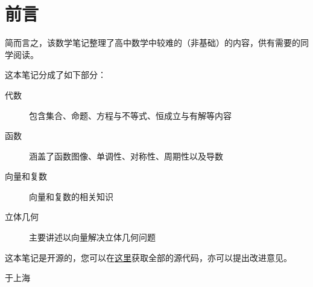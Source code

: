 \section*{前言}
简而言之，该数学笔记整理了高中数学中较难的（非基础）的内容，供有需要的同学阅读。

这本笔记分成了如下部分：

\begin{description}
	\item[代数] 包含集合、命题、方程与不等式、恒成立与有解等内容
	\item[函数] 涵盖了函数图像、单调性、对称性、周期性以及导数
	\item[向量和复数] 向量和复数的相关知识
	\item[立体几何] 主要讲述以向量解决立体几何问题
\end{description}

这本笔记是开源的，您可以在\href{https://github.com/jason-bowen-zheng/math-notes}{这里}获取全部的源代码，亦可以提出改进意见。

\begin{flushright}
	\date{2022年11月}于上海
\end{flushright}
